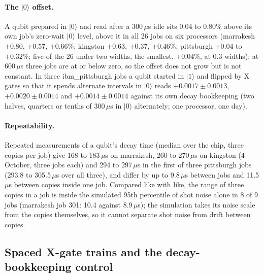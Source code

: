 \documentclass[reprint,amsmath,amssymb,aps,superscriptaddress,nofootinbib]{revtex4-2}
\newcommand{\us}{\,$\mu$s}
\begin{document}
\paragraph*{The $|0\rangle$ offset.} A qubit prepared in $|0\rangle$ and read after a 300\us{} idle sits 0.04 to 0.80\% above its own job's zero-wait $|0\rangle$ level, above it in all 26 jobs on six processors (marrakesh $+0.80$, $+0.57$, $+0.66\%$; kingston $+0.63$, $+0.37$, $+0.46\%$; pittsburgh $+0.04$ to $+0.32\%$; five of the 26 under two widths, the smallest, $+0.04\%$, at 0.3 widths); at 600\us{} three jobs are at or below zero, so the offset does not grow but is not constant. In three ibm\_pittsburgh jobs a qubit started in $|1\rangle$ and flipped by X gates so that it spends alternate intervals in $|0\rangle$ reads $+0.0017\pm0.0013$, $+0.0020\pm0.0014$ and $+0.0014\pm0.0014$ against its own decay bookkeeping (two halves, quarters or tenths of 300\us{} in $|0\rangle$ alternately; one processor, one day).

\paragraph*{Repeatability.} Repeated measurements of a qubit's decay time (median over the chip, three copies per job) give 168 to 183\us{} on marrakesh, 260 to 270\us{} on kingston (4 October, three jobs each) and 294 to 297\us{} in the first of three pittsburgh jobs (293.8 to 305.5\us{} over all three), and differ by up to 9.8\us{} between jobs and 11.5\us{} between copies inside one job. Compared like with like, the range of three copies in a job is inside the simulated 95th percentile of shot noise alone in 8 of 9 jobs (marrakesh job 301: 10.4 against 8.9\us); the simulation takes its noise scale from the copies themselves, so it cannot separate shot noise from drift between copies.

\subsection{Spaced X-gate trains and the decay-bookkeeping control}\label{sec:xtrain}
\end{document}
